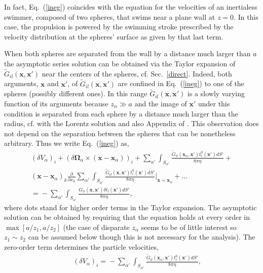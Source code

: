 In fact, Eq.~(\ref{ineg}) coincides with the equation for the velocities of an inertialess swimmer, composed of two spheres, that swims near a plane wall at $z=0$. In this case, the propulsion is powered by the swimming stroke prescribed by the velocity distribution at the spheres' surface as given by that last term.

When both spheres are separated from the wall by a distance much larger than $a$ the asymptotic series solution can be obtained via the Taylor expansion of ${\tilde G}_{il}(\bm x, \bm x')$ near the centers of the spheres, cf.
Sec.~\ref{direct}. Indeed, both arguments, $\bm x$ and $\bm x'$, of ${\tilde G}_{il}(\bm x, \bm x')$ are confined in Eq.~(\ref{ineg}) to one of the spheres (possibly different ones).
In this range ${\tilde G}_{il}(\bm x, \bm x')$ is a slowly varying function of its arguments because $z_{\alpha}\gg a$ and the image of $\bm x'$ under this condition is separated from each sphere by a distance much larger than the radius, cf. with the Lorentz solution \citep{hb} and also Appendix of \cite{fl2018}.
This observation does not depend on the separation between the spheres that can be nonetheless arbitrary.
Thus we write Eq.~(\ref{ineg}) as,
\begin{equation} \begin{aligned}%
(\delta V_{\alpha})_i\!+\!(\delta\bm \Omega_{\alpha}\!\times\! (\bm x\!-\!\bm x_{\alpha}))_i\!+\!\sum_{\alpha'}\int_{S_{\alpha'}}\!\!\!\frac{{\tilde G}_{il}(\bm x_{\alpha}, \bm x')t^0_{l}(\bm x')dS'}{8\pi \eta}
+ \\ (\bm x\!-\!\bm x_{\alpha})_k\frac{\partial}{\partial x_k}\sum_{\alpha'}\int_{S_{\alpha'}}\!\!\!\frac{{\tilde G}_{il}(\bm x, \bm x')t^0_{l}(\bm x')dS'}{8\pi \eta}|_{\bm x=\bm x_{\alpha}}+\ldots \\ %
=\!-\!\sum_{\alpha'}\int_{S_{\alpha'}}\!\!\!\frac{G_{il}(\bm x, \bm x')\delta t_{l}(\bm x')dS'}{8\pi \eta}, \label{fdk}
\end{aligned}\end{equation}
where dots stand for higher order terms in the Taylor expansion. The asymptotic solution can be obtained by requiring that the equation holds at every order in $\max [a/z_1, a/z_2]$ (the case of disparate $z_{\alpha}$ seems to be of little interest so $z_1\sim z_2$ can be assumed below though this is not necessary for the analysis). The zero-order term determines the particle velocities,
\begin{eqnarray}&&\!\!\!\!\!\!\!
(\delta V_{\alpha})_i=\!-\!\sum_{\alpha'}\int_{S_{\alpha'}}\!\!\!\frac{{\tilde G}_{il}(\bm x_{\alpha}, \bm x')t^0_{l}(\bm x')dS'}{8\pi \eta}, \label{ordsa}
\end{eqnarray}
